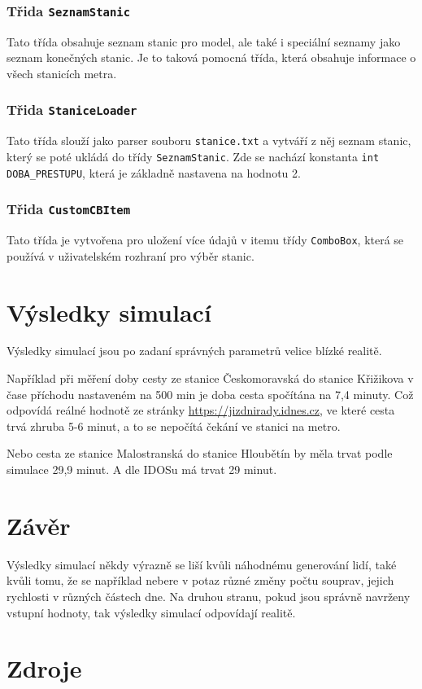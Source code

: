 \documentclass[12pt, a4paper]{article}
\begin{document}
\subsubsection{Třida \texttt{SeznamStanic}}
Tato třída obsahuje seznam stanic pro model, ale také i speciální seznamy jako seznam konečných stanic. Je to taková pomocná třída, která obsahuje informace o všech stanicích metra.

\subsubsection{Třida \texttt{StaniceLoader}}
Tato třída slouží jako parser souboru \texttt{stanice.txt} a vytváří z něj seznam stanic, který se poté ukládá do třídy \texttt{SeznamStanic}. Zde se nachází konstanta \texttt{int DOBA\_PRESTUPU}, která je základně nastavena na hodnotu 2.

\subsubsection{Třida \texttt{CustomCBItem}}
Tato třída je vytvořena pro uložení více údajů v itemu třídy \texttt{ComboBox}, která se používá v uživatelském rozhraní pro výběr stanic.

\section{Výsledky simulací}
Výsledky simulací jsou po zadaní správných parametrů velice blízké realitě. 

Například při měření doby cesty ze stanice Českomoravská do stanice Křižikova v čase příchodu nastaveném na 500 min je doba cesta spočítána na 7,4 minuty. Což odpovídá reálné hodnotě ze stránky \url{https://jizdnirady.idnes.cz}, ve které cesta trvá zhruba 5-6 minut, a to se nepočítá čekání ve stanici na metro.

Nebo cesta ze stanice Malostranská do stanice Hloubětín by měla trvat podle simulace 29,9 minut. A dle IDOSu má trvat 29 minut.

\section{Závěr}
Výsledky simulací někdy výrazně se liší kvůli náhodnému generování lidí, také kvůli tomu, že se například nebere v potaz různé změny počtu souprav, jejich rychlosti v různých částech dne.
\cite{einstein}
Na druhou stranu, pokud jsou správně navrženy vstupní hodnoty, tak výsledky simulací odpovídají realitě.
\section{Zdroje}
\printbibliography
\end{document}
